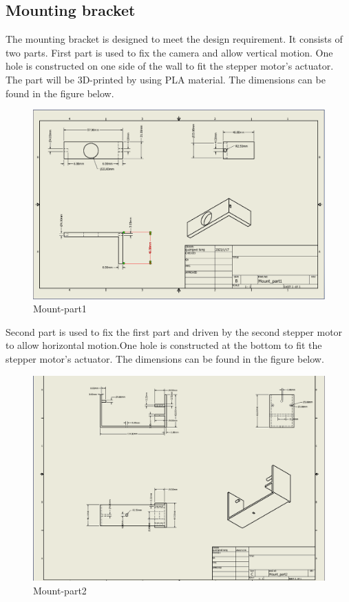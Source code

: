 \documentclass[12pt, titlepage]{article}
\begin{document}
\subsection{Mounting bracket}
The mounting bracket is designed to meet the design requirement. It consists of two parts. First part is used to fix the camera and allow vertical motion. One hole is constructed on one side of the wall to fit the stepper motor's actuator. The part will be 3D-printed by using PLA material. The dimensions can be found in the  figure below.
\begin{figure}[H]
\caption{Mount-part1}
\centering
\includegraphics[width=\textwidth]{mount_part1.png}
\end{figure}
Second part is used to fix the first part and driven by the second stepper motor to allow horizontal motion.One hole is constructed at the bottom to fit the stepper motor's actuator. The dimensions can be found in the figure below.
\begin{figure}[H]
\caption{Mount-part2}
\centering
\includegraphics[width=\textwidth]{mount_part2.png}
\end{figure}
\end{document}
